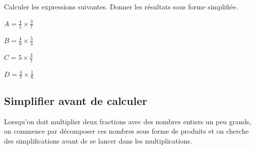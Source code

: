 \documentclass[a4paper]{book}
\begin{document}
    
    \begin{exemple}
        Calculer les expressions suivantes. Donner les résultats sous forme simplifiée.\medskip

        \begin{minipage}{0.24\linewidth}
            $A = \frac{4}{5} \times \frac{3}{7}$

            \vspace{4cm}
        \end{minipage}
        \hfill\vline \hfill
        \begin{minipage}{0.24\linewidth}
            $B = \frac{4}{9} \times \frac{5}{3}$

            \vspace{4cm}
        \end{minipage}
        \hfill\vline \hfill
        \begin{minipage}{0.24\linewidth}
            $C = 5 \times \frac{3}{7}$       

            \vspace{4cm}
        \end{minipage}
        \hfill\vline \hfill
        \begin{minipage}{0.24\linewidth}
            $D = \frac{4}{7}\times\frac{1}{6}$

            \vspace{4cm}
        \end{minipage}
    \end{exemple}
    
    
\subsection{Simplifier avant de calculer}
    
    \begin{remarque}
        Lorsqu'on doit multiplier deux fractions avec des nombres entiers un peu grands, on commence par décomposer ces nombres sous forme de produits et on cherche des simplifications avant de se lancer dans les multiplications.
    \end{remarque}
    
\end{document}
